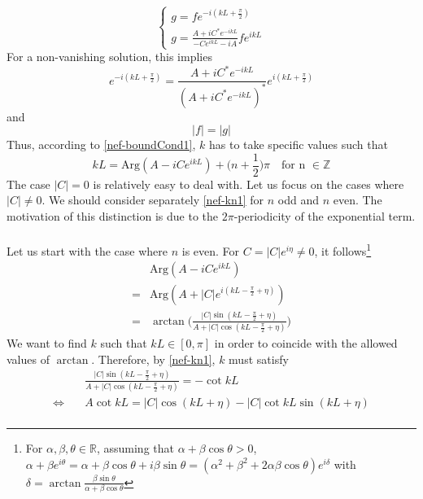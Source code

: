 \begin{equation}\label{nef-boundCond}
\begin{cases}
g = f e^{-i(kL+ \frac{\pi}{2})}  \\
g = \frac{A + iC^* e^{-ikL}}{- C e^{ikL} - iA} f e^{ikL}
\end{cases}
\end{equation}
For a non-vanishing solution, this implies
\begin{equation}\label{nef-boundCond1}
e^{-i(kL + \frac{\pi}{2})} = \frac{A + iC^* e^{-ikL}}{(A + iC^* e^{-ikL})^*} e^{i(kL + \frac{\pi}{2})}
\end{equation}
and 
\begin{equation}\label{nef-boundCond2}
| f | = | g |
\end{equation}
Thus, according to \cref{nef-boundCond1}, $k$ has to take specific values such that
\begin{equation}\label{nef-kn1}
kL =  \textrm{Arg}(A - iC e^{ikL}) + \big(n+\frac{1}{2} \big)\pi   \quad \textrm{for n $\in \mathbb{Z}$}
\end{equation}
The case $|C| =0$ is relatively easy to deal with. Let us focus on the cases where $|C| \neq 0$. We should consider separately \cref{nef-kn1} for $n$ odd and $n$ even. 
The motivation of this distinction is due to the $2\pi$-periodicity of the exponential term. \\\\
Let us start with the case where $n$ is even. 
For $C = |C| e^{i\eta} \neq 0 $, it follows\footnote{
For $\alpha, \beta, \theta \in \mathbb{R}$, assuming that $\alpha + \beta \cos \theta > 0$, $\alpha + \beta e^{i \theta} = \alpha + \beta \cos \theta + i\beta \sin \theta = (\alpha^2 + \beta^2 + 2\alpha \beta \cos \theta) e^{i \delta}$ with $\delta = \arctan \frac{\beta\sin\theta}{\alpha + \beta\cos\theta}$  
} 
\begin{equation}
\begin{split}
&\textrm{Arg}(A - iC e^{ikL}) \\
= &\textrm{Arg}(A + |C| e^{i(kL - \frac{\pi}{2} + \eta)}) \\
= & \arctan \bigg( \frac{|C| \sin(kL - \frac{\pi}{2} + \eta)}{A + | C| \cos(kL - \frac{\pi}{2} + \eta) }\bigg)
\end{split}
\end{equation}
We want to find $k$ such that $kL \in [0, \pi]$ in order to coincide with the allowed values of $\arctan$.
Therefore, by \cref{nef-kn1}, $k$ must satisfy
\begin{equation}\label{nef-arctan}
\begin{split}
& \frac{|C| \sin(kL - \frac{\pi}{2} + \eta)}{A + | C| \cos(kL - \frac{\pi}{2} + \eta) } =  - \cot kL  \\
\Leftrightarrow \quad & A \cot kL = |C| \cos(kL + \eta) - |C| \cot kL \sin(kL + \eta)  \\
\end{split}
\end{equation}
